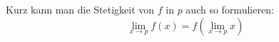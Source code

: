 Kurz kann man die Stetigkeit von $f$ in $p$ auch so formulieren:
$$\lim_{x \to p} f(x) = f(\lim_{x \to p} x)$$